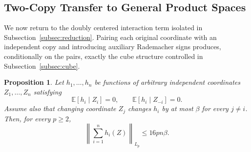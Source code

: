 \documentclass[11pt]{article}
\newtheorem{proposition}{Proposition}
\newcommand{\E}{\mathbb{E}}
\newcommand{\norm}[1]{\left\lVert #1\right\rVert}
\begin{document}
\subsection{Two-Copy Transfer to General Product Spaces}\label{subsec:transfer}

We now return to the doubly centered interaction term isolated in Subsection~\ref{subsec:reduction}. Pairing each original coordinate with an independent copy and introducing auxiliary Rademacher signs produces, conditionally on the pairs, exactly the cube structure controlled in Subsection~\ref{subsec:cube}.

\begin{proposition}\label{prop:transfer}
Let $h_1,\ldots,h_n$ be functions of arbitrary independent coordinates $Z_1,\ldots,Z_n$ satisfying
\begin{equation}\label{eq:double-center}
\E[h_i\mid Z_i]=0,
\qquad
\E[h_i\mid Z_{-i}]=0.
\end{equation}
Assume also that changing coordinate $Z_j$ changes $h_i$ by at most $\beta$ for every $j\neq i$.
Then, for every $p\ge2$,
\[
\norm{\sum_{i=1}^n h_i(Z)}_{L_p} \le 16pn\beta.
\]
\end{proposition}
\end{document}

